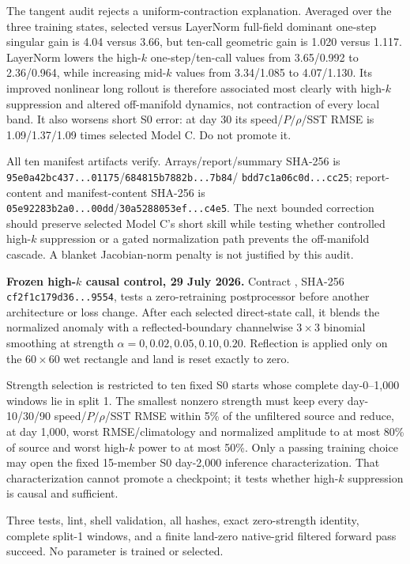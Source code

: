 \documentclass[11pt]{article}
\begin{document}
The tangent audit rejects a uniform-contraction explanation.  Averaged over
the three training states, selected versus LayerNorm full-field dominant
one-step singular gain is 4.04 versus 3.66, but ten-call geometric gain is
1.020 versus 1.117.  LayerNorm lowers the high-\(k\) one-step/ten-call
values from 3.65/0.992 to 2.36/0.964, while increasing mid-\(k\) values
from 3.34/1.085 to 4.07/1.130.  Its improved nonlinear long rollout is
therefore associated most clearly with high-\(k\) suppression and altered
off-manifold dynamics, not contraction of every local band.  It also worsens
short S0 error: at day 30 its speed/\(P/\rho\)/SST RMSE is
1.09/1.37/1.09 times selected Model C.  Do not promote it.

All ten manifest artifacts verify.  Arrays/report/summary SHA-256 is
\texttt{95e0a42bc437...01175}/\texttt{684815b7882b...7b84}/
\texttt{bdd7c1a06c0d...cc25}; report-content and manifest-content SHA-256
is \texttt{05e92283b2a0...00dd}/\texttt{30a5288053ef...c4e5}.  The next
bounded correction should preserve selected Model C's short skill while
testing whether controlled high-\(k\) suppression or a gated normalization
path prevents the off-manifold cascade.  A blanket Jacobian-norm penalty is
not justified by this audit.

\textbf{Frozen high-\(k\) causal control, 29 July 2026.}  Contract
, SHA-256
\texttt{cf2f1c179d36...9554}, tests a zero-retraining postprocessor before
another architecture or loss change.  After each selected direct-state call,
it blends the normalized anomaly with a reflected-boundary channelwise
\(3\times3\) binomial smoothing at strength
\(\alpha=0,0.02,0.05,0.10,0.20\).  Reflection is applied only on the
\(60\times60\) wet rectangle and land is reset exactly to zero.

Strength selection is restricted to ten fixed S0 starts whose complete
day-0--1,000 windows lie in split 1.  The smallest nonzero strength must
keep every day-10/30/90 speed/\(P/\rho\)/SST RMSE within 5\% of the
unfiltered source and reduce, at day 1,000, worst RMSE/climatology and
normalized amplitude to at most 80\% of source and worst high-\(k\) power
to at most 50\%.  Only a passing training choice may open the fixed
15-member S0 day-2,000 inference characterization.  That characterization
cannot promote a checkpoint; it tests whether high-\(k\) suppression is
causal and sufficient.

Three tests, lint, shell validation, all hashes, exact zero-strength
identity, complete split-1 windows, and a finite land-zero native-grid
filtered forward pass succeed.  No parameter is trained or selected.
\end{document}
